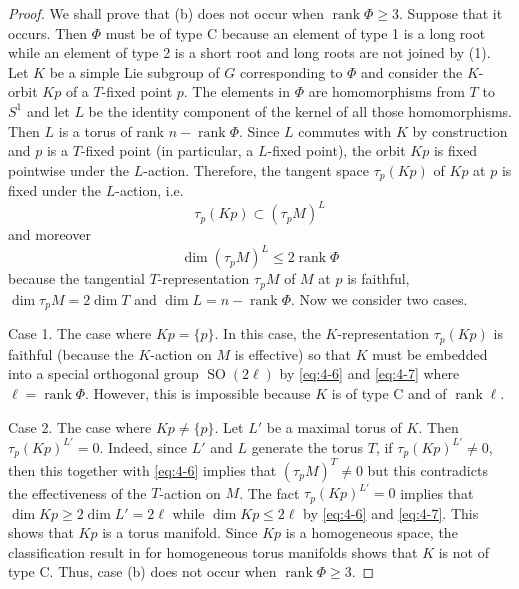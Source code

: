 \documentclass[12pt]{amsart}
\theoremstyle{plain} \numberwithin{equation}{section}
\theoremstyle{definition}
\DeclareMathOperator{\rank}{rank}
\DeclareMathOperator{\SO}{SO}
\begin{document}
\begin{proof}
We shall prove that (b) does not occur when $\rank\Phi\ge 3$.  
Suppose that it occurs.  Then $\Phi$ must be of type C because an element of type 1 is a long root while an element of type 2 is a short root and long roots are not joined by (1).   Let $K$ be a simple Lie subgroup of $G$ corresponding to $\Phi$ and consider the $K$-orbit $Kp$ of a $T$-fixed point $p$.  The elements in $\Phi$ are homomorphisms from $T$ to $S^1$ and let $L$ be the identity component of the kernel of all those homomorphisms. Then $L$ is a torus of rank $n-\rank\Phi$.  Since $L$ commutes with $K$ by construction and $p$ is a $T$-fixed point (in particular, a $L$-fixed point), the orbit $Kp$ is fixed pointwise under the $L$-action.  Therefore, the tangent space $\tau_p(Kp)$ of $Kp$ at $p$ is fixed under the $L$-action, i.e. 
\begin{equation} \label{eq:4-6}
\tau_p(Kp)\subset (\tau_pM)^L 
\end{equation}
and moreover  
\begin{equation} \label{eq:4-7}
\dim (\tau_pM)^L\le 2\rank\Phi
\end{equation}
because the tangential $T$-representation $\tau_pM$ of $M$ at $p$ is faithful, $\dim \tau_pM=2\dim T$ and $\dim L=n-\rank\Phi$.  Now we consider two cases. 

Case 1. The case where $Kp=\{p\}$.  In this case, the $K$-representation $\tau_p(Kp)$ is faithful (because the $K$-action on $M$ is effective) so that $K$ must be embedded into a special orthogonal group $\SO(2\ell)$ by \eqref{eq:4-6} and \eqref{eq:4-7} where $\ell=\rank\Phi$.  However, this is impossible because $K$ is of type C and of $\rank\ell$.  

Case 2. The case where $Kp\not=\{p\}$.  %
Let $L'$ be a maximal torus of $K$.  Then $\tau_p(Kp)^{L'}=0$.  Indeed, since $L'$ and $L$ generate the torus $T$, if $\tau_p(Kp)^{L'}\not=0$, then this together with \eqref{eq:4-6} implies that $(\tau_pM)^T\not=0$ but this contradicts the effectiveness of the $T$-action on $M$.  The fact $\tau_p(Kp)^{L'}=0$ implies that $\dim Kp\ge 2\dim L'=2\ell$ while $\dim Kp\le 2\ell$ by \eqref{eq:4-6} and \eqref{eq:4-7}.  This shows that $Kp$ is a torus manifold.  Since $Kp$ is a homogeneous space, the classification result in \cite{kuro10} for homogeneous torus manifolds shows that $K$ is not of type C.  Thus, case (b) does not occur when $\rank\Phi\ge 3$.   
\end{proof}
\end{document}
